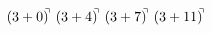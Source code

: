 \documentclass[preview]{standalone}
\begin{document}
\begin{align*}
(3+0)^{\hspace{-0.1cm}\urcorner} \ (3+4)^{\hspace{-0.1cm}\urcorner} \ (3+7)^{\hspace{-0.1cm}\urcorner} \ (3+11)^{\hspace{-0.1cm}\urcorner}
\end{align*}
\end{document}
